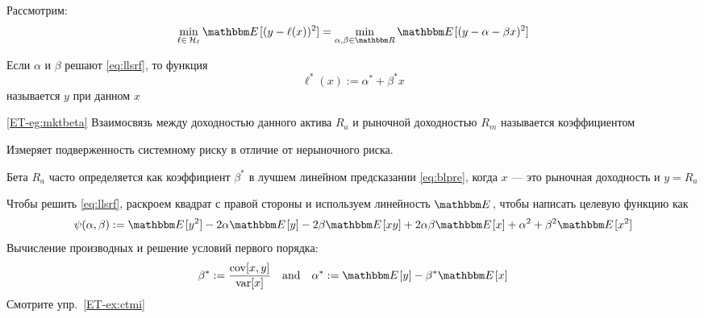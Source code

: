 \begin{frame}

    \vspace{2em}
    Рассмотрим:
    \begin{equation}
        \label{eq:llsrf}
        \min_{\ell \in \, \llL} \EE[ (y - \ell(x))^2 ] 
        = \min_{\alpha, \beta \in \RR} \EE[ (y - \alpha - \beta x)^2 ] 
    \end{equation}
    
    \vspace{.7em}
    Если $\alpha$ и $\beta$ решают \eqref{eq:llsrf}, то функция
    \begin{equation}
        \label{eq:blpre}
        \ell^*(x) := \alpha^* + \beta^* x
    \end{equation}
    называется  $y$ при данном $x$
    
\end{frame}

\begin{frame}

    \vspace{2em}
    \Eg\eqref{ET-eg:mktbeta}
    Взаимосвязь между доходностью данного актива $R_a$ и рыночной доходностью 
    $R_m$ называется коэффициентом 
    
    Измеряет подверженность системному риску в отличие от нерыночного риска.
    
    \vspace{.7em}
    Бета $R_a$ часто определяется как коэффициент
    $\beta^*$ в лучшем линейном предсказании \eqref{eq:blpre}, когда $x$ --- это
    рыночная доходность и $y=R_a$
    
\end{frame}

\begin{frame}

    \vspace{2em}
    Чтобы решить \eqref{eq:llsrf}, раскроем квадрат с правой стороны и
    используем линейность $\EE$, чтобы написать целевую функцию как
    \begin{equation*}
        \psi(\alpha, \beta) 
        := \EE [y^2] - 2 \alpha \EE[y] - 2 \beta \EE[xy] + 2\alpha\beta \EE[x]
            + \alpha^2 + \beta^2 \EE[x^2]
    \end{equation*}
    Вычисление производных и решение условий первого порядка:
    \begin{equation}
        \label{eq:slpp}
        \beta^* := \frac{\cov[x,y]}{\var[x]}
        \quad \text{and} \quad
        \alpha^* := \EE[y] - \beta^* \EE[x]
    \end{equation}
    Смотрите упр.~\ref{ET-ex:ctmi}
    
\end{frame}

